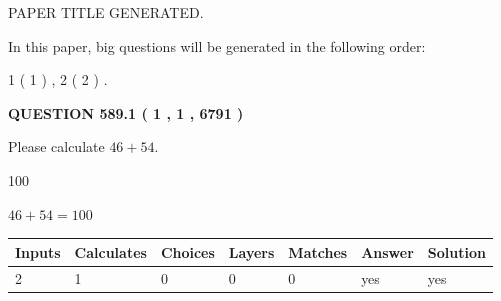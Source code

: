 \documentclass[12pt]{article}
\begin{document}
   
\vspace{0.2in}
   
   
   
   
   
   
   
   
 \vspace{0.2in}
 
 
 
 
   
   
 PAPER TITLE GENERATED.
   
   
   
\vspace{0.2in}
   
In this paper, big questions will be generated in the following order: 
   
   
   1 ( 1 )
 ,
   2 ( 2 )
 .
  
\vspace{0.2in}
  
{\textbf{\Large{QUESTION
589.1 
 ( 1 , 1 , 6791 )
}}}
  
  
 
Please calculate $ %
46 +  %
54 $.
 
 
 
\noindent{}
 
 

100
 
 
\noindent{}
 
 

 
 
 
\noindent{}
 
 

$ %
46 +  %
54=   %
100$
 
 
\noindent{}
 
 

 
   
   
   
   
\noindent\begin{tabular}{|l|l|l|l|l|l|l|}
 \hline
Inputs & Calculates & Choices & Layers & Matches & Answer & Solution \\ \hline
 2  & 
 1  & 
 0
  & 
 0  & 
 0  & 
  yes & 
  yes 
  \\ \hline
 \end{tabular}
   
\end{document}
